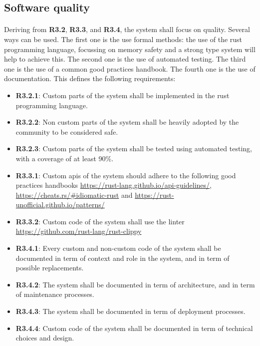 \subsection{Software quality}

\paragraph{}
Deriving from \textbf{R3.2}, \textbf{R3.3}, and \textbf{R3.4}, the system shall focus on quality. Several ways can be used. The first one is the use formal methods: the use of the rust programming language, focussing on memory safety and a strong type system will help to achieve this. The second one is the use of automated testing. The third one is the use of a common good practices handbook. The fourth one is the use of documentation. This defines the following requirements:

\begin{itemize}
    \item \textbf{R3.2.1}: Custom parts of the system shall be implemented in the rust programming language.
    \item \textbf{R3.2.2}: Non custom parts of the system shall be heavily adopted by the community to be considered safe.
    \item \textbf{R3.2.3}: Custom parts of the system shall be tested using automated testing, with a coverage of at least 90\%.
    \item \textbf{R3.3.1}: Custom apis of the system should adhere to the following good practices handbooks \url{https://rust-lang.github.io/api-guidelines/}, \url{https://cheats.rs/#idiomatic-rust} and \url{https://rust-unofficial.github.io/patterns/}
    \item \textbf{R3.3.2}: Custom code of the system shall use the linter \url{https://github.com/rust-lang/rust-clippy}
    \item \textbf{R3.4.1}: Every custom and non-custom code of the system shall be documented in term of context and role in the system, and in term of possible replacements.
    \item \textbf{R3.4.2}: The system shall be documented in term of architecture, and in term of maintenance processes.
    \item \textbf{R3.4.3}: The system shall be documented in term of deployment processes.
    \item \textbf{R3.4.4}: Custom code of the system shall be documented in term of technical choices and design.
\end{itemize}




